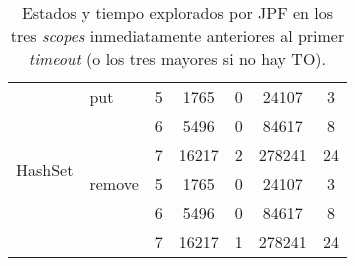 \begin{table}[H]
\begin{tabular}{ c| l| c c c c c}
\multirow{6}{*}{HashSet} 
& put
& 5 & 1765  & 0 & 24107 & 3 \\
& & 6 & 5496  & 0 & 84617 & 8 \\
& & 7 & 16217 & 2 & 278241  & 24  \\

\cline{2-7}
& remove
& 5 & 1765  & 0 & 24107 & 3 \\
& & 6 & 5496  & 0 & 84617 & 8 \\
& & 7 & 16217 & 1 & 278241  & 24  \\
\hline

\end{tabular}%
\caption{Estados y tiempo explorados por JPF en los tres \emph{scopes} inmediatamente anteriores al primer \emph{timeout} (o los tres mayores si no hay TO).}
\label{tab:results-jpf1-trim}
\end{table}
